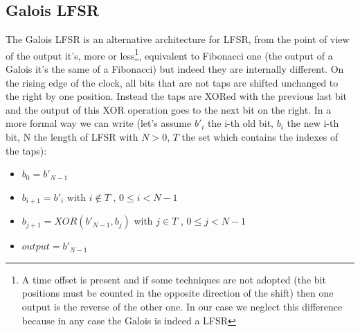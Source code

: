 \documentclass[a4paper]{report}
\begin{document}
\subsection{Galois LFSR}
The Galois LFSR is an alternative architecture for LFSR, from the point of view of the output it's, more or less\footnote{A time offset is present and if some techniques are not adopted (the bit positions must be counted in the opposite direction of the shift) then one output is the reverse of the other one. In our case we neglect this difference because in any case the Galois is indeed a LFSR}, equivalent to Fibonacci one (the output of a Galois it's the same of a Fibonacci) but indeed they are internally different. On the rising edge of the clock, all bits that are not taps are shifted unchanged to the right by one position. Instead the taps are XORed with the previous last bit and the output of this XOR operation goes to the next bit on the right. In a more formal way we can write (let's assume $b'_i$ the i-th old bit, $b_i$ the new i-th bit, N the length of LFSR with $N>0$, $T$ the set which contains the indexes of the taps):
\begin{itemize}
	\item $b_0 = b'_{N-1}$
	\item $b_{i+1} = b'_i$ with $i\notin T$ , $0\le i < N-1$
	\item $b_{j+1} = XOR(b'_{N-1} , b_j)$ with $j \in T$ , $0\le j < N-1$
	\item $output = b'_{N-1}$
\end{itemize}
\end{document}
